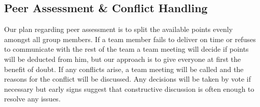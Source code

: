 \documentclass[11pt]{article}
\begin{document}
\subsection{Peer Assessment \& Conflict Handling}
Our plan regarding peer assessment is to split the available points evenly amongst all group members. If a team member fails to deliver on time or refuses to communicate with the rest of the team a team meeting will decide if points will be deducted from him, but our approach is to give everyone at first the benefit of doubt. If any conflicts arise, a team meeting will be called and the reasons for the conflict will be discussed. Any decisions will be taken by vote if necessary but early signs suggest that constructive discussion is often enough to resolve any issues.  

\end{document}
